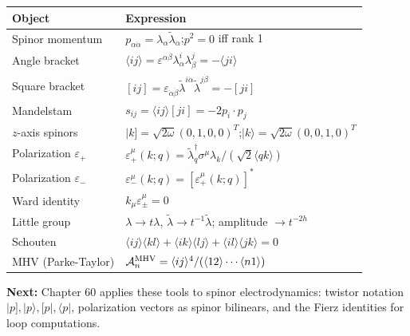 \documentclass[12pt]{article}
\begin{document}
\begin{center}
\renewcommand{\arraystretch}{1.5}
\begin{tabular}{@{}ll@{}}
  \toprule
  Object & Expression \\
  \midrule
  Spinor momentum & $p_{\alpha\dot\alpha} = \lambda_\alpha\tilde\lambda_{\dot\alpha}$;\quad $p^2=0$ iff rank 1 \\
  Angle bracket & $\langle ij\rangle = \varepsilon^{\alpha\beta}\lambda^i_\alpha\lambda^j_\beta = -\langle ji\rangle$ \\
  Square bracket & $[ij] = \varepsilon_{\dot\alpha\dot\beta}\tilde\lambda^{i\dot\alpha}\tilde\lambda^{j\dot\beta} = -[ji]$ \\
  Mandelstam & $s_{ij} = \langle ij\rangle[ji] = -2p_i\cdot p_j$ \\
  $z$-axis spinors & $|k]=\sqrt{2\omega}(0,1,0,0)^T$;\quad $|k\rangle=\sqrt{2\omega}(0,0,1,0)^T$ \\
  Polarization $\varepsilon_+$ & $\varepsilon_+^\mu(k;q) = \tilde\lambda_q^{\dagger}\sigma^\mu\lambda_k / (\sqrt{2}\langle qk\rangle)$ \\
  Polarization $\varepsilon_-$ & $\varepsilon_-^\mu(k;q) = [\varepsilon_+^\mu(k;q)]^*$ \\
  Ward identity & $k_\mu\varepsilon_\pm^\mu = 0$ \\
  Little group & $\lambda\to t\lambda$,\; $\tilde\lambda\to t^{-1}\tilde\lambda$;\; amplitude $\to t^{-2h}$ \\
  Schouten & $\langle ij\rangle\langle kl\rangle+\langle ik\rangle\langle lj\rangle+\langle il\rangle\langle jk\rangle=0$ \\
  MHV (Parke-Taylor) & $\mathcal{A}_n^{\rm MHV}=\langle ij\rangle^4/(\langle12\rangle\cdots\langle n1\rangle)$ \\
  \bottomrule
\end{tabular}
\end{center}

\bigskip
\noindent\textbf{Next:} Chapter 60 applies these tools to spinor electrodynamics:
twistor notation $|p], |p\rangle, [p|, \langle p|$, polarization vectors as
spinor bilinears, and the Fierz identities for loop computations.
\end{document}
